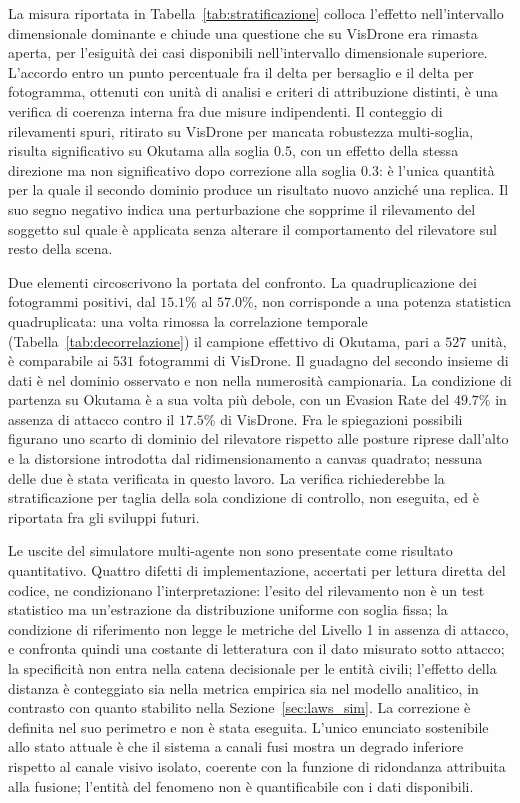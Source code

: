 \documentclass[a4paper,12pt]{report}
\begin{document}
La misura riportata in Tabella~\ref{tab:stratificazione} colloca l'effetto nell'intervallo dimensionale dominante e chiude una questione che su VisDrone era rimasta aperta, per l'esiguità dei casi disponibili nell'intervallo dimensionale superiore. L'accordo entro un punto percentuale fra il delta per bersaglio e il delta per fotogramma, ottenuti con unità di analisi e criteri di attribuzione distinti, è una verifica di coerenza interna fra due misure indipendenti. Il conteggio di rilevamenti spuri, ritirato su VisDrone per mancata robustezza multi-soglia, risulta significativo su Okutama alla soglia $0.5$, con un effetto della stessa direzione ma non significativo dopo correzione alla soglia $0.3$: è l'unica quantità per la quale il secondo dominio produce un risultato nuovo anziché una replica. Il suo segno negativo indica una perturbazione che sopprime il rilevamento del soggetto sul quale è applicata senza alterare il comportamento del rilevatore sul resto della scena.

Due elementi circoscrivono la portata del confronto. La quadruplicazione dei fotogrammi positivi, dal $15.1\%$ al $57.0\%$, non corrisponde a una potenza statistica quadruplicata: una volta rimossa la correlazione temporale (Tabella~\ref{tab:decorrelazione}) il campione effettivo di Okutama, pari a $527$ unità, è comparabile ai $531$ fotogrammi di VisDrone. Il guadagno del secondo insieme di dati è nel dominio osservato e non nella numerosità campionaria. La condizione di partenza su Okutama è a sua volta più debole, con un Evasion Rate del $49.7\%$ in assenza di attacco contro il $17.5\%$ di VisDrone. Fra le spiegazioni possibili figurano uno scarto di dominio del rilevatore rispetto alle posture riprese dall'alto e la distorsione introdotta dal ridimensionamento a canvas quadrato; nessuna delle due è stata verificata in questo lavoro. La verifica richiederebbe la stratificazione per taglia della sola condizione di controllo, non eseguita, ed è riportata fra gli sviluppi futuri.

Le uscite del simulatore multi-agente non sono presentate come risultato quantitativo. Quattro difetti di implementazione, accertati per lettura diretta del codice, ne condizionano l'interpretazione: l'esito del rilevamento non è un test statistico ma un'estrazione da distribuzione uniforme con soglia fissa; la condizione di riferimento non legge le metriche del Livello 1 in assenza di attacco, e confronta quindi una costante di letteratura con il dato misurato sotto attacco; la specificità non entra nella catena decisionale per le entità civili; l'effetto della distanza è conteggiato sia nella metrica empirica sia nel modello analitico, in contrasto con quanto stabilito nella Sezione~\ref{sec:laws_sim}. La correzione è definita nel suo perimetro e non è stata eseguita. L'unico enunciato sostenibile allo stato attuale è che il sistema a canali fusi mostra un degrado inferiore rispetto al canale visivo isolato, coerente con la funzione di ridondanza attribuita alla fusione; l'entità del fenomeno non è quantificabile con i dati disponibili.
\end{document}
